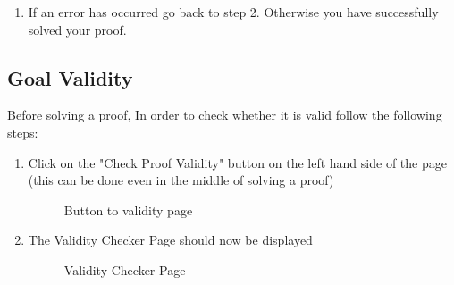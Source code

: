 \begin{enumerate}
		\item If an error has occurred go back to step 2. Otherwise you have successfully solved your proof.
		
		
\end{enumerate}
\pagebreak
\subsection{Goal Validity}

Before solving a proof, In order to check whether it is valid follow the following steps:

\begin{enumerate}
	\item Click on the "Check Proof Validity" button on the left hand side of the page (this can be done even in the middle of solving a proof)
	
	\begin{figure}[!ht]
		\centering
		\caption{Button to validity page}
	\end{figure}

	\item The Validity Checker Page should now be displayed
	
	\begin{figure}[!ht]
		\centering
		\caption{Validity Checker Page}
	\end{figure}
	

\end{enumerate}
